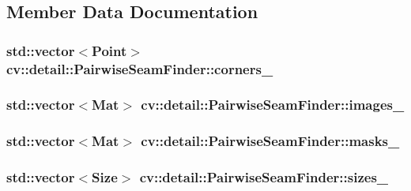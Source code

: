 \subsection{Member Data Documentation}
\hypertarget{classcv_1_1detail_1_1PairwiseSeamFinder_a73b7891ed68d55b25011fbcdb6d5f4da}{
\subsubsection[{corners\-\_\-}]{\setlength{\rightskip}{0pt plus 5cm}std\-::vector$<$Point$>$ cv\-::detail\-::\-Pairwise\-Seam\-Finder\-::corners\-\_\-\hspace{0.3cm}{\ttfamily [protected]}}}\label{classcv_1_1detail_1_1PairwiseSeamFinder_a73b7891ed68d55b25011fbcdb6d5f4da}
\hypertarget{classcv_1_1detail_1_1PairwiseSeamFinder_a6202e4edcd4051de88e8012ec998b4ea}{
\subsubsection[{images\-\_\-}]{\setlength{\rightskip}{0pt plus 5cm}std\-::vector$<$Mat$>$ cv\-::detail\-::\-Pairwise\-Seam\-Finder\-::images\-\_\-\hspace{0.3cm}{\ttfamily [protected]}}}\label{classcv_1_1detail_1_1PairwiseSeamFinder_a6202e4edcd4051de88e8012ec998b4ea}
\hypertarget{classcv_1_1detail_1_1PairwiseSeamFinder_a53c6eeed8de59b4b4e439c1fb8db14b9}{
\subsubsection[{masks\-\_\-}]{\setlength{\rightskip}{0pt plus 5cm}std\-::vector$<$Mat$>$ cv\-::detail\-::\-Pairwise\-Seam\-Finder\-::masks\-\_\-\hspace{0.3cm}{\ttfamily [protected]}}}\label{classcv_1_1detail_1_1PairwiseSeamFinder_a53c6eeed8de59b4b4e439c1fb8db14b9}
\hypertarget{classcv_1_1detail_1_1PairwiseSeamFinder_a5abe230ead5af1b35d94cb3f2b867787}{
\subsubsection[{sizes\-\_\-}]{\setlength{\rightskip}{0pt plus 5cm}std\-::vector$<$Size$>$ cv\-::detail\-::\-Pairwise\-Seam\-Finder\-::sizes\-\_\-\hspace{0.3cm}{\ttfamily [protected]}}}\label{classcv_1_1detail_1_1PairwiseSeamFinder_a5abe230ead5af1b35d94cb3f2b867787}


